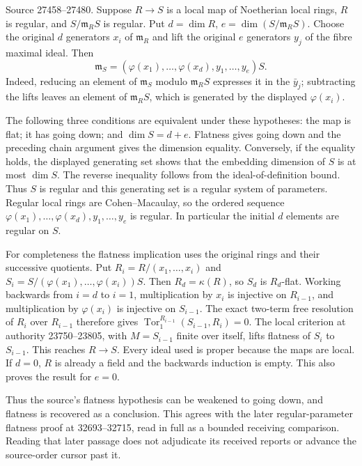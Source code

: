 Source 27458--27480. Suppose \(R\to S\) is a local map of Noetherian local rings, \(R\) is regular, and \(S/\mathfrak m_RS\) is regular. Put \(d=\dim R\), \(e=\dim(S/\mathfrak m_RS)\). Choose the original \(d\) generators \(x_i\) of \(\mathfrak m_R\) and lift the original \(e\) generators \(y_j\) of the fibre maximal ideal. Then \[
 \mathfrak m_S=(\varphi(x_1),\ldots,\varphi(x_d),y_1,\ldots,y_e)S.
\] Indeed, reducing an element of \(\mathfrak m_S\) modulo \(\mathfrak m_RS\) expresses it in the \(\bar y_j\); subtracting the lifts leaves an element of \(\mathfrak m_RS\), which is generated by the displayed \(\varphi(x_i)\).

The following three conditions are equivalent under these hypotheses: the map is flat; it has going down; and \(\dim S=d+e\). Flatness gives going down and the preceding chain argument gives the dimension equality. Conversely, if the equality holds, the displayed generating set shows that the embedding dimension of \(S\) is at most \(\dim S\). The reverse inequality follows from the ideal-of-definition bound. Thus \(S\) is regular and this generating set is a regular system of parameters. Regular local rings are Cohen--Macaulay, so the ordered sequence \(\varphi(x_1),\ldots,\varphi(x_d),y_1,\ldots,y_e\) is regular. In particular the initial \(d\) elements are regular on \(S\).

For completeness the flatness implication uses the original rings and their successive quotients. Put \(R_i=R/(x_1,\ldots,x_i)\) and \(S_i=S/(\varphi(x_1),\ldots,\varphi(x_i))S\). Then \(R_d=\kappa(R)\), so \(S_d\) is \(R_d\)-flat. Working backwards from \(i=d\) to \(i=1\), multiplication by \(x_i\) is injective on \(R_{i-1}\), and multiplication by \(\varphi(x_i)\) is injective on \(S_{i-1}\). The exact two-term free resolution of \(R_i\) over \(R_{i-1}\) therefore gives \(\operatorname{Tor}_1^{R_{i-1}}(S_{i-1},R_i)=0\). The local criterion at authority 23750--23805, with \(M=S_{i-1}\) finite over itself, lifts flatness of \(S_i\) to \(S_{i-1}\). This reaches \(R\to S\). Every ideal used is proper because the maps are local. If \(d=0\), \(R\) is already a field and the backwards induction is empty. This also proves the result for \(e=0\).

Thus the source's flatness hypothesis can be weakened to going down, and flatness is recovered as a conclusion. This agrees with the later regular-parameter flatness proof at 32693--32715, read in full as a bounded receiving comparison. Reading that later passage does not adjudicate its received reports or advance the source-order cursor past it.

